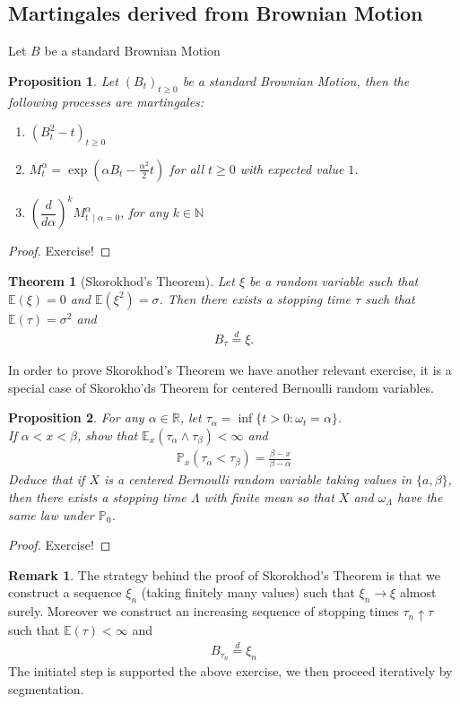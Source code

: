 \documentclass[11pt,a4paper, final]{article}
\newtheorem{thm}{Theorem}[section]
\newtheorem{prop}{Proposition}[section]
\theoremstyle{definition}
\newtheorem{rem}{Remark}[section]
\begin{document}
\subsection{Martingales derived from Brownian Motion}
Let $B$ be a standard Brownian Motion
\begin{prop} Let $(B_t)_{t \geq 0}$ be a standard Brownian Motion, then the following processes are martingales:
\begin{enumerate}
\item $(B_t^2-t)_{t \geq 0}$ 
\item $M_t^\alpha = \exp\left( \alpha B_t - \frac{\alpha^2}{2}t \right)$ for all $t \geq 0$ with expected value $1$. 
\item $\left( \dfrac{d}{d \alpha} \right)^k M_{t \ \mid \alpha =0} ^\alpha$, for any $k \in \mathbb{N}$
\end{enumerate}
\end{prop}
\begin{proof}
Exercise!
\end{proof}
\begin{thm}[Skorokhod's Theorem] Let $\xi$ be a random variable such that $\mathbb{E}( \xi)=0$ and $\mathbb{E}( \xi^2)= \sigma$. Then there exists a stopping time $\tau$ such that $\mathbb{E}( \tau)= \sigma^2$ and 
\begin{align*}
B_\tau \overset{d}= \xi. 
\end{align*}
\end{thm}
\noindent In order to prove Skorokhod's Theorem we have another relevant exercise, it is a special case of Skorokho'ds Theorem for centered Bernoulli random variables. 
\begin{prop} For any $\alpha \in \mathbb{R}$, let $\tau_\alpha = \inf \lbrace t >0 : \omega_t = \alpha \rbrace$. \\ If $\alpha < x < \beta$, show that $\mathbb{E}_x( \tau_\alpha \wedge \tau_\beta) < \infty$ and 
\begin{align*}
\mathbb{P}_x ( \tau_\alpha < \tau_\beta) = \frac{\beta-x}{\beta-\alpha}
\end{align*}
Deduce that if $X$ is a centered Bernoulli random variable taking values in $\lbrace a, \beta \rbrace$, then there exists a stopping time $\Lambda$ with finite mean so that $X$ and $\omega_\Lambda$ have the same law under $\mathbb{P}_0$. 
\end{prop}
\begin{proof}
Exercise!
\end{proof}
\begin{rem} The strategy behind the proof of Skorokhod's Theorem is that we construct a sequence $\xi_n$ (taking finitely many values) such that $\xi_n \to \xi$ almost surely. Moreover we construct an increasing sequence of stopping times $\tau_n \uparrow \tau$ such that $\mathbb{E}( \tau ) < \infty$ and 
\begin{align*}
B_{\tau_n} \overset{d}= \xi_n
\end{align*}
The initiatel step is supported the above exercise, we then proceed iteratively by segmentation. 
\end{rem}
\end{document}
